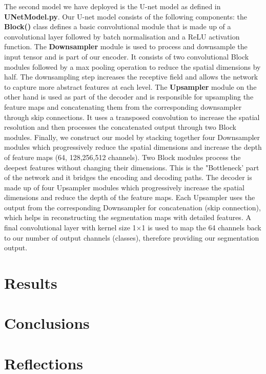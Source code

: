 \documentclass[a4paper,11pt]{article}
\begin{document}
The second model we have deployed is the U-net model as defined in \textbf{UNetModel.py}. Our U-net model consists of the following components: the \textbf{Block()} class defines a basic convolutional module that is made up of a convolutional layer followed by batch normalisation and a ReLU activation function. The \textbf{Downsampler} module is used to process and downsample the input tensor and is part of our encoder. It consists of two convolutional Block modules followed by a max pooling operation to reduce the spatial dimensions by half. The downsampling step increases the receptive field and allows the network to capture more abstract features at each level. The \textbf{Upsampler} module on the other hand is used as part of the decoder and is responsible for upsampling the feature maps and concatenating them from the corresponding downsampler through skip connections. It uses a transposed convolution to increase the spatial resolution and then processes the concatenated output through two Block modules. Finally, we construct our model by stacking together four Downsampler modules which progressively reduce the spatial dimensions and increase the depth of feature maps (64, 128,256,512 channels). Two Block modules process the deepest features without changing their dimensions. This is the "Bottleneck' part of the network and it bridges the encoding and decoding paths. The decoder is made up of four Upsampler modules which progressively increase the spatial dimensions and reduce the depth of the feature maps. Each Upsampler uses the output from the corresponding Downsampler for concatenation (skip connection), which helps in reconstructing the segmentation maps with detailed features. A final convolutional layer with kernel size 1$\times$1 is used to map the 64 channels back to our number of output channels (classes), therefore providing our segmentation output. 







































\section{Results}

\section{Conclusions}

\section{Reflections}



\end{document}
